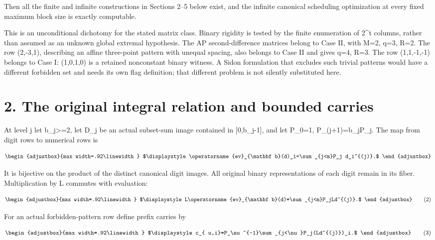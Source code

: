 Then all the finite and infinite constructions in Sections 2--5 below exist, and the infinite canonical scheduling optimization at every fixed maximum block size is exactly computable.

This is an unconditional dichotomy for the stated matrix class. Binary rigidity is tested by the finite enumeration of 2\^{}t columns, rather than assumed as an unknown global extremal hypothesis. The AP second-difference matrices belong to Case II, with M=2, q=3, R=2. The row (2,-3,1), describing an affine three-point pattern with unequal spacing, also belongs to Case II and gives q=4, R=3. The row (1,1,-1,-1) belongs to Case I: (1,0,1,0) is a retained nonconstant binary witness. A Sidon formulation that excludes such trivial patterns would have a different forbidden set and needs its own flag definition; that different problem is not silently substituted here.

\section{2. The original integral relation and bounded carries}\label{n06-the-original-integral-relation-and-bounded-carries}

At level j let b\_j\textgreater=2, let D\_j be an actual subset-sum image contained in {[}0,b\_j-1{]}, and let P\_0=1, P\_(j+1)=b\_jP\_j. The map from digit rows to numerical rows is

\[
\begin{adjustbox}{max width=.92\linewidth}
$\displaystyle \operatorname{ev}_{\mathbf b}(d)_i=\sum_{j<m}P_j d_i^{(j)}.$
\end{adjustbox}
\]

It is bijective on the product of the distinct canonical digit images. All original binary representations of each digit remain in its fiber. Multiplication by L commutes with evaluation:

\[
\begin{adjustbox}{max width=.92\linewidth}
$\displaystyle L\operatorname{ev}_{\mathbf b}(d)=\sum_{j<m}P_jLd^{(j)}.$
\end{adjustbox}
\tag{2}
\]

For an actual forbidden-pattern row define prefix carries by

\[
\begin{adjustbox}{max width=.92\linewidth}
$\displaystyle c_{
u,i}=P_\nu^{-1}\sum_{j<\nu}P_j(Ld^{(j)})_i.$
\end{adjustbox}
\tag{3}
\]

